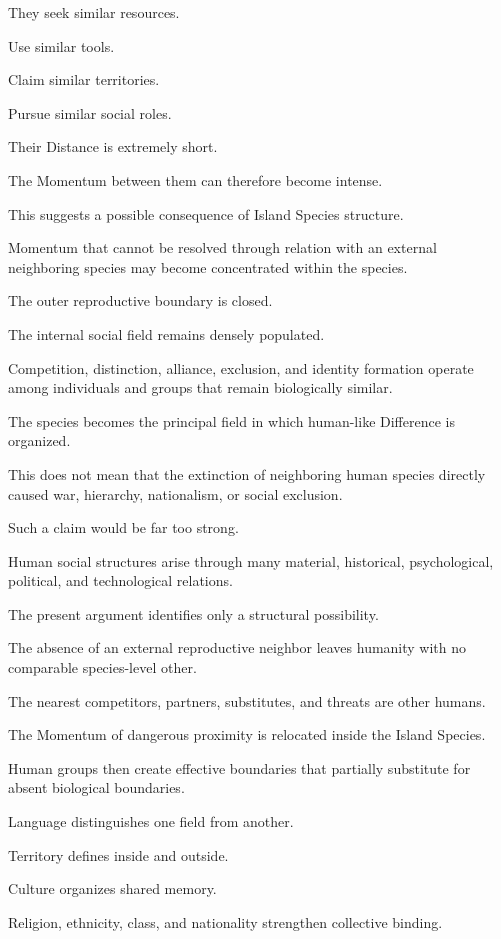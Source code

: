 They seek similar resources.

Use similar tools.

Claim similar territories.

Pursue similar social roles.

Their Distance is extremely short.

The Momentum between them can therefore become intense.

This suggests a possible consequence of Island Species structure.

Momentum that cannot be resolved through relation with an external neighboring species may become concentrated within the species.

The outer reproductive boundary is closed.

The internal social field remains densely populated.

Competition, distinction, alliance, exclusion, and identity formation operate among individuals and groups that remain biologically similar.

The species becomes the principal field in which human-like Difference is organized.

This does not mean that the extinction of neighboring human species directly caused war, hierarchy, nationalism, or social exclusion.

Such a claim would be far too strong.

Human social structures arise through many material, historical, psychological, political, and technological relations.

The present argument identifies only a structural possibility.

The absence of an external reproductive neighbor leaves humanity with no comparable species-level other.

The nearest competitors, partners, substitutes, and threats are other humans.

The Momentum of dangerous proximity is relocated inside the Island Species.

Human groups then create effective boundaries that partially substitute for absent biological boundaries.

Language distinguishes one field from another.

Territory defines inside and outside.

Culture organizes shared memory.

Religion, ethnicity, class, and nationality strengthen collective binding.

